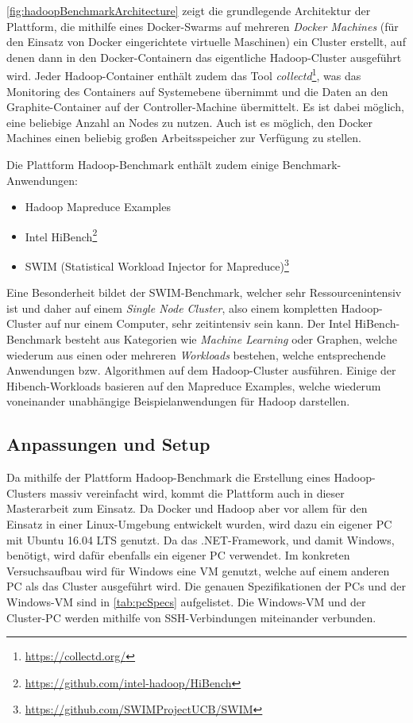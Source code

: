 \autoref{fig:hadoopBenchmarkArchitecture} zeigt die grundlegende Architektur der Plattform, die mithilfe eines Docker-Swarms auf mehreren \emph{Docker Machines} (für den Einsatz von Docker eingerichtete virtuelle Maschinen) ein Cluster erstellt, auf denen dann in den Docker-Containern das eigentliche Hadoop-Cluster ausgeführt wird. Jeder Hadoop-Container enthält zudem das Tool \emph{collectd}\footnote{\url{https://collectd.org/}}, was das Monitoring des Containers auf Systemebene übernimmt und die Daten an den Graphite-Container auf der Controller-Machine übermittelt. Es ist dabei möglich, eine beliebige Anzahl an Nodes zu nutzen. Auch ist es möglich, den Docker Machines einen beliebig großen Arbeitsspeicher zur Verfügung zu stellen.

Die Plattform Hadoop-Benchmark enthält zudem einige Benchmark-Anwendungen:

\begin{itemize}
    \item Hadoop Mapreduce Examples
    \item Intel HiBench\footnote{\url{https://github.com/intel-hadoop/HiBench}}
    \item SWIM (Statistical Workload Injector for Mapreduce)\footnote{\url{https://github.com/SWIMProjectUCB/SWIM}}
\end{itemize}

Eine Besonderheit bildet der SWIM-Benchmark, welcher sehr Ressourcenintensiv ist und daher auf einem \emph{Single Node Cluster}, also einem kompletten Hadoop-Cluster auf nur einem Computer, sehr zeitintensiv sein kann. Der Intel HiBench-Benchmark besteht aus Kategorien wie \emph{Machine Learning} oder Graphen, welche wiederum aus einen oder mehreren \emph{Workloads} bestehen, welche entsprechende Anwendungen bzw. Algorithmen auf dem Hadoop-Cluster ausführen. Einige der Hibench-Workloads basieren auf den Mapreduce Examples, welche wiederum voneinander unabhängige Beispielanwendungen für Hadoop darstellen.

\subsection{Anpassungen und Setup}\label{sec:clusterFallstudie}

Da mithilfe der Plattform Hadoop-Benchmark die Erstellung eines Hadoop-Clusters massiv vereinfacht wird, kommt die Plattform auch in dieser Masterarbeit zum Einsatz. Da Docker und Hadoop aber vor allem für den Einsatz in einer Linux-Umgebung entwickelt wurden, wird dazu ein eigener PC mit Ubuntu 16.04 LTS genutzt. Da \sS das .NET-Framework, und damit Windows, benötigt, wird dafür ebenfalls ein eigener PC verwendet. Im konkreten Versuchsaufbau wird für Windows eine VM genutzt, welche auf einem anderen PC als das Cluster ausgeführt wird. Die genauen Spezifikationen der PCs und der Windows-VM sind in \autoref{tab:pcSpecs} aufgelistet. Die Windows-VM und der Cluster-PC werden mithilfe von SSH-Verbindungen miteinander verbunden.

